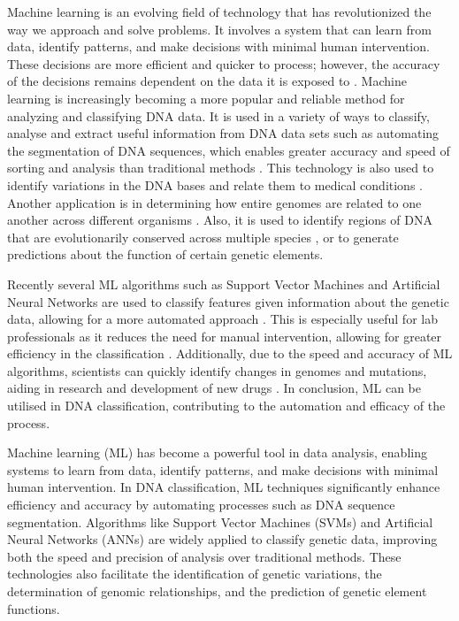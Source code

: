 Machine learning is an evolving field of technology that has revolutionized the way we approach and solve problems. It involves a system that can learn from data, identify patterns, and make decisions with minimal human intervention. These decisions are more efficient and quicker to process; however, the accuracy of the decisions remains dependent on the data it is exposed to \cite{gama2011}.  Machine learning is increasingly becoming a more popular and reliable method for analyzing and classifying DNA data.  It is used in a variety of ways to classify, analyse and extract useful information from DNA data sets such as automating the segmentation of DNA sequences, which enables greater accuracy and speed of sorting and analysis than traditional methods \cite{chambert2019}. This technology is also used to identify variations in the DNA bases and relate them to medical conditions \cite{Kallman2019}.
Another application is in determining how entire genomes are related to one another across different organisms \cite{cottrell2017}. Also, it is used to identify regions of DNA that are evolutionarily conserved across multiple species \cite{monsalve2019}, or to generate predictions about the function of certain genetic elements. 

Recently several ML algorithms such as Support Vector Machines and Artificial Neural Networks are used to classify features given information about the genetic data, allowing for a more automated approach \cite{kalender2020}. This is especially useful for lab professionals as it reduces the need for manual intervention, allowing for greater efficiency in the classification \cite{vihar2019}. Additionally, due to the speed and accuracy of ML algorithms, scientists can quickly identify changes in genomes and mutations, aiding in research and development of new drugs \cite{neto2021}. In conclusion, ML can be utilised in DNA classification, contributing to the automation and efficacy of the process.

Machine learning (ML) has become a powerful tool in data analysis, enabling systems to learn from data, identify patterns, and make decisions with minimal human intervention. In DNA classification, ML techniques significantly enhance efficiency and accuracy by automating processes such as DNA sequence segmentation. Algorithms like Support Vector Machines (SVMs) and Artificial Neural Networks (ANNs) are widely applied to classify genetic data, improving both the speed and precision of analysis over traditional methods. These technologies also facilitate the identification of genetic variations, the determination of genomic relationships, and the prediction of genetic element functions.

